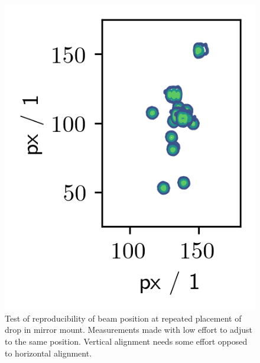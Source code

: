 \documentclass[twoside,openright]{scrreprt}
\begin{document}
\begin{figure}[hbtp]
\centering
\includegraphics[scale=1]{images/DropinMirrorStudy.png}
\caption{Test of reproducibility of beam position at repeated placement of drop in mirror mount. Measurements made with low effort to adjust to the same position. Vertical alignment needs some effort opposed to horizontal alignment.\label{fig:DropinStudy}}
\end{figure}




\end{document}
